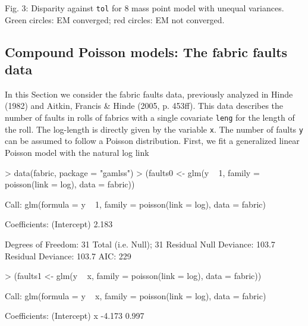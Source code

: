\documentclass[a4paper]{article}
\begin{document}
\begin{landscape}
\begin{minipage}{21cm}
Fig. 3: Disparity against {\tt tol} for 8 mass point model with unequal variances. Green circles: EM converged; red circles: EM not converged.
\end{minipage}
 
\subsection{Compound Poisson models: The fabric faults data}

In this Section we consider the fabric faults data,  previously analyzed in Hinde (1982) and  Aitkin,  Francis \& Hinde (2005, p. 453ff). 
This data describes the number of faults in rolls of fabrics with a single covariate {\tt leng} for the length of the roll. The log-length is directly given by the variable {\tt x}.  
The number of faults {\tt y}  can be assumed to follow a Poisson distribution. First, we fit a generalized linear Poisson model with the natural log link
\begin{Schunk}
\begin{Sinput}
> data(fabric, package = "gamlss")
> (faults0 <- glm(y ~ 1, family = poisson(link = log), data = fabric))
\end{Sinput}
\begin{Soutput}
Call:  glm(formula = y ~ 1, family = poisson(link = log), data = fabric) 

Coefficients:
(Intercept)  
      2.183  

Degrees of Freedom: 31 Total (i.e. Null);  31 Residual
Null Deviance:	    103.7 
Residual Deviance: 103.7 	AIC: 229 
\end{Soutput}
\begin{Sinput}
> (faults1 <- glm(y ~ x, family = poisson(link = log), data = fabric))
\end{Sinput}
\begin{Soutput}
Call:  glm(formula = y ~ x, family = poisson(link = log), data = fabric) 

Coefficients:
(Intercept)            x  
     -4.173        0.997  


\end{Soutput}
\end{Schunk}
\end{landscape}
\end{document}
